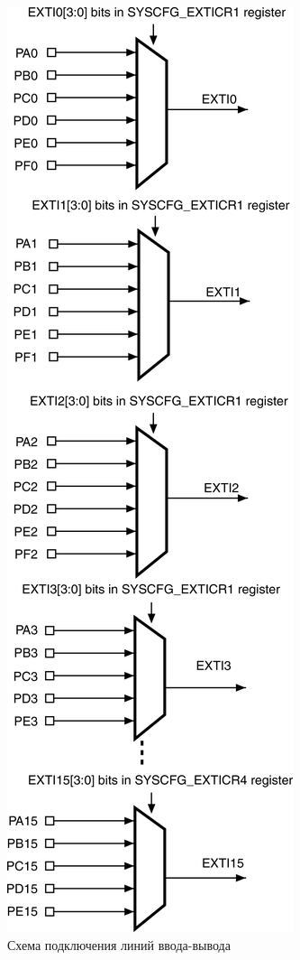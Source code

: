 \begin{figure}[H]
\begin{center}
\includegraphics[scale=0.18]{Image/66.jpg} 
\end{center}
\caption{Схема подключения линий ввода-вывода}\label{InputOutput}
\end{figure}

